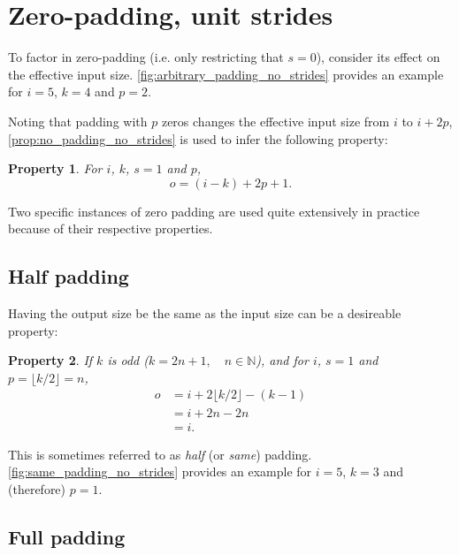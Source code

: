 \documentclass{report}
\newtheorem{prop}{Property}
\begin{document}
\section{Zero-padding, unit strides}

To factor in zero-padding (i.e. only restricting that $s = 0$), consider its
effect on the effective input size. \autoref{fig:arbitrary_padding_no_strides}
provides an example for $i = 5$, $k = 4$ and $p = 2$.

Noting that padding with $p$ zeros changes the effective input size from $i$ to
$i + 2p$, \autoref{prop:no_padding_no_strides} is used to infer the following
property:

\begin{prop}\label{prop:arbitrary_padding_no_strides}
For $i$, $k$, $s = 1$ and $p$,
\begin{equation*}
    o = (i - k) + 2p + 1.
\end{equation*}
\end{prop}

Two specific instances of zero padding are used quite extensively in practice
because of their respective properties.

\subsection{Half padding}

Having the output size be the same as the input size can be a desireable
property:

\begin{prop}\label{prop:same_padding_no_strides}
If $k$ is odd ($k = 2n + 1, \quad n \in \mathbb{N}$), and for $i$, $s = 1$ and
$p = \lfloor k / 2 \rfloor = n$,
\begin{equation*}
\begin{split}
    o &= i + 2 \lfloor k / 2 \rfloor - (k - 1) \\
      &= i + 2n - 2n \\
      &= i.
\end{split}
\end{equation*}
\end{prop}

This is sometimes referred to as {\em half} (or {\em same}) padding.
\autoref{fig:same_padding_no_strides} provides an example for $i = 5$, $k = 3$
and (therefore) $p = 1$.

\subsection{Full padding}
\end{document}
